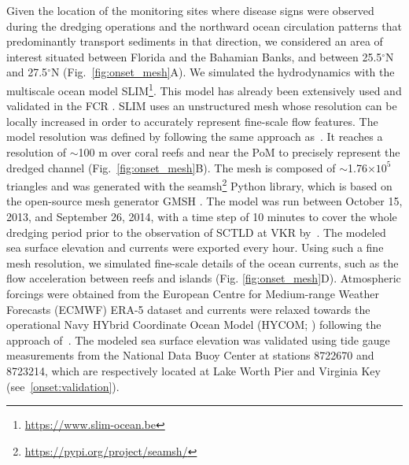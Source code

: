 \documentclass[preprint,12pt,authoryear]{elsarticle}
\begin{document}
Given the location of the monitoring sites where disease signs were observed during the dredging operations and the northward ocean circulation patterns that predominantly transport sediments in that direction, we considered an area of interest situated between Florida and the Bahamian Banks, and between 25.5$^\circ$N and 27.5$^\circ$N (Fig.~\ref{fig:onset_mesh}A). We simulated the hydrodynamics with the multiscale ocean model SLIM\footnote{\url{ https://www.slim-ocean.be}}. This model has already been extensively used and validated in the FCR \citep{frys2020fine,dobbelaere2020coupled,dobbelaere2022impacts,dobbelaere2022connecting}. SLIM uses an unstructured mesh whose resolution can be locally increased in order to accurately represent fine-scale flow features. The model resolution was defined by following the same approach as~\citep{dobbelaere2020coupled}. It reaches a resolution of $\sim$100 m over coral reefs and near the PoM to precisely represent the dredged channel (Fig.~\ref{fig:onset_mesh}B). The mesh is composed of $\sim$1.76$\times 10^5$ triangles and was generated with the seamsh\footnote{\url{https://pypi.org/project/seamsh/}} Python library, which is based on the open-source mesh generator GMSH \citep{geuzaine2009gmsh}. The model was run between October 15, 2013, and September 26, 2014, with a time step of 10 minutes to cover the whole dredging period prior to the observation of SCTLD at VKR by~\cite{precht2016unprecedented}. The modeled sea surface elevation and currents were exported every hour. Using such a fine mesh resolution, we simulated fine-scale details of the ocean currents, such as the flow acceleration between reefs and islands (Fig. \ref{fig:onset_mesh}D). Atmospheric forcings were obtained from the European Centre for Medium-range Weather Forecasts (ECMWF) ERA-5 dataset and currents were relaxed towards the operational Navy HYbrid Coordinate Ocean Model (HYCOM; \citealp{chassignet2007hycom}) following the approach of~\cite{dobbelaere2022impacts}. The modeled sea surface elevation was validated using tide gauge measurements from the National Data Buoy Center at stations 8722670 and 8723214, which are respectively located at Lake Worth Pier and Virginia Key (see~\ref{onset:validation}).
\end{document}
